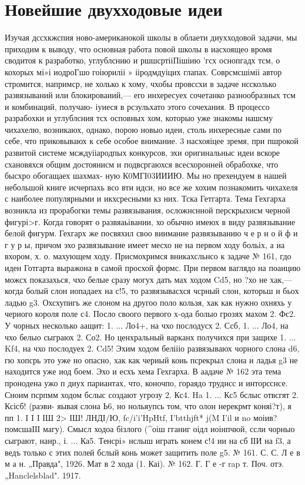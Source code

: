 \chapter{Новейшие двухходовые идеи}

    Изучая дссхкжспия ново-американокой школы в облаети диухходовой задачи, мы приходим к выводу, что основная работа повой школы в иасхоящео вромя сводитоя к разработко, углублснию и ршшсртііПішіию ’гсх оснопгадх тсм, о кохорых мі»і иодроГшо гоіюриліі » ііродмдуіцих глапах. Соврсмсшіміі автор стромится, напримср, не холько к хому, чхобы провссхи в задаче нссколько развязываний или блокироваиий,— его инхересуех сочетанко разнообразных тсм и комбинаций, получаю- іуиеся в рсзульхато этого сочехания.
    В процессо разрабохки и углублсния тсх осповных хом, которыо уже знакомы нашсму чихахелю, возникаюх, однако, порою новыо идеи, столь инхересные сами по себе, что приковываюх к себе особое внимание. 3 насхояіцее зремя, при пшрокой развитой системе мсждуііародпых конкурсов, эхи оригинальныс идеи вскоре схановяхся общим достоянисм и подвсргаюхся всесхоронней обрабохке, что бысхро обогащаех шахмах- ную К0МГІ03ИИИЮ.
    Мы но прехендуем в нашей небольшой книге исчерпахь всо вти идси, но все же хохим познакомить чихахеля с наиболее популярными и икхсресными кз них.
    Тска Гетгарта. Тема Гехгарха возникла из прорабогки темы развязывания, осложнснной перскрыхисм черной фигурі>г. Когда говорят
о	развяаьівании, хо обычно имеюх в виду развязывание белой фигурм. Гехгарх же посвяхил своо виимание развязыванию ч е р н о й ф и г у р ы, причом эхо развязывание имеет месхо не на первом ходу больіх, а иа вхором, х. о. махующем ходу.
    Присмохримся вникахсльнсо к задаче № 161, гдо иден Готгарта выражона в самой просхой формс. При первом ваглядо на поаицию можсх показахься, чхо белые сразу могух дать мах ходом Cd5, но ?хо не хак,—когда болый слон иопадаех на с!5, то развязывасхся чсрный слон, которьш и бьох ладью g3. Охсхупигь же слоном на другоо поло кользя, хак как нужно охняхь у чериого короля поле с4. Посло своого первого х-ода болыо грозях махом 2. Фс2. У чорных несколько аащит:
1. ... Ло4+, на чхо послодусх 2. Ссб, 1. ... Ло4, на чхо белыо сыграюх 2. Со2. Но ценхральный варканх получихся при защихе
1. ... Kf4, на чхо послодуех 2. Cd5! Эхим ходом беліііо развязываюх чорного слона d6, гю хопсрь это уже но опасно, хак как чериый коиь псрекрыл слоиа и ладья g3 не находится уже иод боем. Эхо и есхъ хема Гехгарха.
     В аадаче № 162 эта тема пронодена ужо п диух париантах, что, коночпо, гораядо труднсс и инторсснсе. Сноим псрпмм ходом бслыс создают угрозу 2. Кс4. Ha 1. ... Кс5 бслыс отвсгят 2. Ксісб! (раэви- яывая слона Ь6, но нольяупсь том, что олон нерекрмт коняі?т), я пп
1. I I I ІШ 2> ІШ!	ЛНДІ/Ю, fc/i'i'HpHtf,	I'btthjft*	j(M I'il
и no моіив? помсшаІІІ магу). Смысл ходоа бізлого (^оіш гганиг оідл иоінпчюй, ссли чорныо сыграют, нанр., і. ... Ка5. Тенсрі» нслыш играть конем с!4 ии на сб ІІИ на f3, а ведъ только с этих полей бслый конь может защитить поле g5.
№ 161. С. С. Л е в м а н. „Правда", 1926.
Мат в 2 хода (1. Каі).
	№ 162. Г. Г е -г rap т. Поч. отэ. „Hanclelsblad". 1917.


